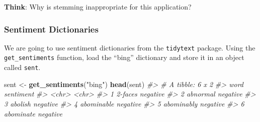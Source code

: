 \documentclass[
]{book}
\newenvironment{Shaded}{\begin{snugshade}}{\end{snugshade}}
\newcommand{\CommentTok}[1]{\textcolor[rgb]{0.56,0.35,0.01}{\textit{#1}}}
\newcommand{\DataTypeTok}[1]{\textcolor[rgb]{0.13,0.29,0.53}{#1}}
\newcommand{\KeywordTok}[1]{\textcolor[rgb]{0.13,0.29,0.53}{\textbf{#1}}}
\newcommand{\NormalTok}[1]{#1}
\newcommand{\OperatorTok}[1]{\textcolor[rgb]{0.81,0.36,0.00}{\textbf{#1}}}
\newcommand{\OtherTok}[1]{\textcolor[rgb]{0.56,0.35,0.01}{#1}}
\newcommand{\StringTok}[1]{\textcolor[rgb]{0.31,0.60,0.02}{#1}}
\begin{document}
\textbf{Think}: Why is stemming inappropriate for this application?

\begin{Shaded}
\end{Shaded}

\hypertarget{sentiment-dictionaries}{%
\subsubsection*{Sentiment Dictionaries}\label{sentiment-dictionaries}}

We are going to use sentiment dictionaries from the \texttt{tidytext} package. Using the \texttt{get\_sentiments} function, load the ``bing'' dictionary and store it in an object called \texttt{sent}.

\begin{Shaded}
\begin{Highlighting}[]
\NormalTok{sent <-}\StringTok{ }\KeywordTok{get_sentiments}\NormalTok{(}\StringTok{"bing"}\NormalTok{)}
\KeywordTok{head}\NormalTok{(sent)}
\CommentTok{#> # A tibble: 6 x 2}
\CommentTok{#>   word       sentiment}
\CommentTok{#>   <chr>      <chr>    }
\CommentTok{#> 1 2-faces    negative }
\CommentTok{#> 2 abnormal   negative }
\CommentTok{#> 3 abolish    negative }
\CommentTok{#> 4 abominable negative }
\CommentTok{#> 5 abominably negative }
\CommentTok{#> 6 abominate  negative}
\end{Highlighting}
\end{Shaded}
\end{document}
